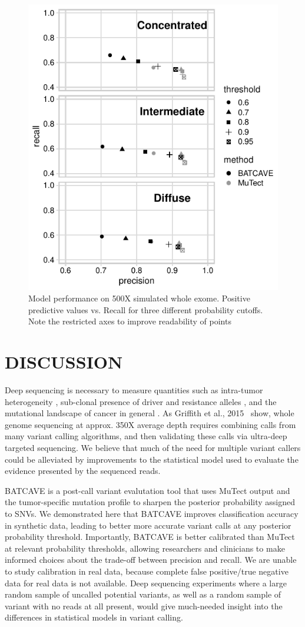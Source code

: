 \documentclass[a4,center,fleqn]{NAR}
\newcommand{\batcave}{BATCAVE }
\begin{document}
\begin{figure}
  \begin{center}
  \includegraphics[width=.35\textwidth]{figures/ppv_wes.pdf}
  \end{center}
  \caption{Model performance on 500X simulated whole exome. 
  Positive predictive values vs. Recall for three different probability cutoffs. 
  Note the restricted axes to improve readability of points}
\label{NAR-ppv_fig}
\end{figure}



\section{DISCUSSION}
 
Deep sequencing is necessary to measure quantities such as intra-tumor heterogeneity \citep{Shi2018}, sub-clonal presence of driver and resistance alleles \cite{Griffith2015}, and the mutational landscape of cancer in general \cite{Zehir2017}.  
As Griffith et al., 2015~\citep{Griffith2015} show, whole genome sequencing at approx. 350X average depth requires combining calls from many variant calling algorithms, and then validating these calls via ultra-deep targeted sequencing. 
We believe that much of the need for multiple variant callers could be alleviated by improvements to the statistical model used to evaluate the evidence presented by the sequenced reads. 

\batcave is a post-call variant evalutation tool that uses MuTect output and the tumor-specific mutation profile to sharpen the posterior probability assigned to SNVs.
We demonstrated here that \batcave improves classification accuracy in synthetic data, leading to better more accurate variant calls at any posterior probability threshold.
Importantly, \batcave is better calibrated than MuTect at relevant probability thresholds, allowing researchers and clinicians to make informed choices about the trade-off between precision and recall.
We are unable to study calibration in real data, because complete false positive/true negative data for real data is not available. 
Deep sequencing experiments where a large random sample of uncalled potential variants, as well as a random sample of variant with no reads at all present, would give much-needed insight into the differences in statistical models in variant calling.
\end{document}

